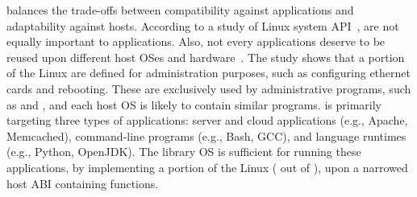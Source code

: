 \graphene{} balances the trade-offs
between compatibility against applications and adaptability against hosts.
According to
a study of Linux system API~\cite{tsai16apistudy},
\linuxapi{} are not equally important to applications.
Also, not every applications deserve to be reused upon different host OSes and hardware~\cite{ubuntu-popularity}.
The study shows that
a portion of the Linux \linuxapis{} are defined for administration purposes,
such as configuring ethernet cards and rebooting.
These \linuxapis{} are exclusively used by administrative programs,
such as  and ,
and each host OS is likely to contain similar programs.
\graphene{} is primarily targeting three types of applications:
server and cloud applications (e.g., Apache, Memcached), command-line programs (e.g., Bash, GCC), and language runtimes (e.g., Python, OpenJDK).
The \graphene{} library OS is sufficient for running these applications,
by implementing a portion of the Linux \linuxapis{} (\graphenesyscallnum{} out of \linuxsyscallnum{}),
upon a narrowed host ABI containing \palcallnum{} functions.









